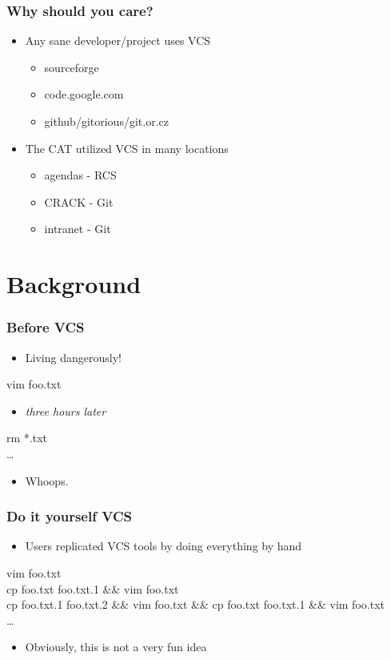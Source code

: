 \documentclass{beamer}
\begin{document}
\begin{frame}
  \frametitle{Why should you care?}
  \begin{itemize}
    \item Any sane developer/project uses VCS
      \begin{itemize}
	\item sourceforge
	\item code.google.com
	\item github/gitorious/git.or.cz
      \end{itemize}
    \item The CAT utilized VCS in many locations
      \begin{itemize}
	\item agendas - RCS
	\item CRACK - Git
	\item intranet - Git
      \end{itemize}
  \end{itemize}
\end{frame}

\section{Background}

\begin{frame}
  \frametitle{Before VCS}
  \begin{itemize}
    \item Living dangerously!
  \end{itemize}
  vim foo.txt \\
  \begin{itemize}
    \item {\em three hours later} \\
  \end{itemize}
  rm *.txt \\
  \ldots \\
  \begin{itemize}
    \item Whoops. \\
  \end{itemize}
\end{frame}

\begin{frame}
  \frametitle{Do it yourself VCS}
  \begin{itemize}
    \item Users replicated VCS tools by doing everything by hand
  \end{itemize}
  vim foo.txt \\
  cp foo.txt foo.txt.1 \&\& vim foo.txt \\
  cp foo.txt.1 foo.txt.2 \&\& vim foo.txt \&\& cp foo.txt foo.txt.1 \&\& vim foo.txt \\
  \ldots
  \begin{itemize}
    \item Obviously, this is not a very fun idea
  \end{itemize}
\end{frame}
\end{document}
